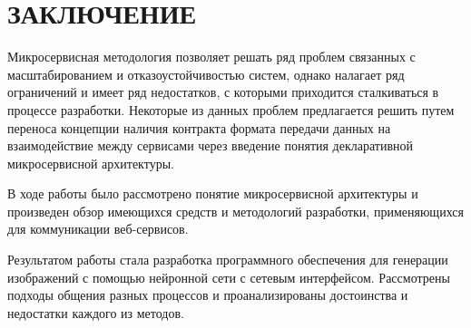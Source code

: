\chapter*{ \large ЗАКЛЮЧЕНИЕ}

Микросервисная методология позволяет решать ряд проблем связанных с масштабированием и отказоустойчивостью систем, однако налагает ряд ограничений и имеет ряд недостатков, с которыми приходится сталкиваться в процессе разработки. Некоторые из данных проблем предлагается решить путем переноса концепции наличия контракта формата передачи данных на взаимодействие между сервисами через введение понятия декларативной микросервисной архитектуры.

В ходе работы было рассмотрено понятие микросервисной архитектуры и произведен обзор имеющихся средств и методологий разработки, применяющихся для коммуникации веб-сервисов.

Результатом работы стала разработка программного обеспечения для генерации изображений
с помощью нейронной сети с сетевым интерфейсом. 
Рассмотрены подходы общения разных процессов и проанализированы достоинства и недостатки каждого из методов.
